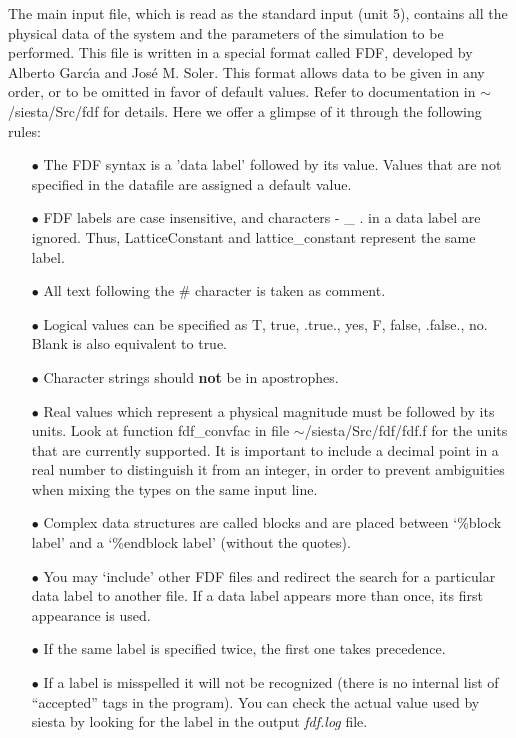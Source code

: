 \documentclass[11pt]{article}
\begin{document}
The main input file,
which is read as the standard input (unit 5),
contains all the physical data of the system and the parameters of
the simulation to be performed.
This file is written in a special format called FDF, developed by
Alberto Garc\'{\i}a and Jos\'e M. Soler. This format allows data to be
given in any order, or to be omitted in favor of default values.
Refer to documentation in $\sim$/siesta/Src/fdf for details.
Here we offer a glimpse of it through the following rules:

\begin{itemize}

\item[$\bullet$] The FDF syntax is a 'data label' followed by its value.
Values that are not specified in the datafile are assigned
a default value.

\item[$\bullet$] FDF labels are case insensitive, and characters - \_ .
in a data label are ignored. Thus, LatticeConstant and
lattice\_constant represent the same label.

\item[$\bullet$] All text following the \# character is taken as comment.

\item[$\bullet$] Logical values can be specified as T, true, .true.,
yes, F, false, .false., no. Blank is also equivalent to true.

\item[$\bullet$] Character strings should {\bf not} be in apostrophes.

\item[$\bullet$] Real values which represent a physical magnitude must be
followed by its units. Look at function fdf\_convfac in
file $\sim$/siesta/Src/fdf/fdf.f for the units that are currently supported.
It is important to include a decimal point in a real number to distinguish
it from an integer, in order to prevent ambiguities when mixing the types
on the same input line.

\item[$\bullet$] Complex data structures are called blocks and are
placed between `\%block label' and a `\%endblock label'
(without the quotes).

\item[$\bullet$] You may `include' other FDF files and redirect the search
for a particular data label to another file.
If a data label appears more than once, its first appearance
is used.

\item[$\bullet$] If the same label is specified twice, the first one takes precedence.

\item[$\bullet$] If a label is misspelled it will not be recognized (there is no
  internal list of ``accepted'' tags in the program). You can check 
  the actual value used by siesta by looking for the label in the
  output {\it fdf.log} file.

\end{itemize}
\end{document}
